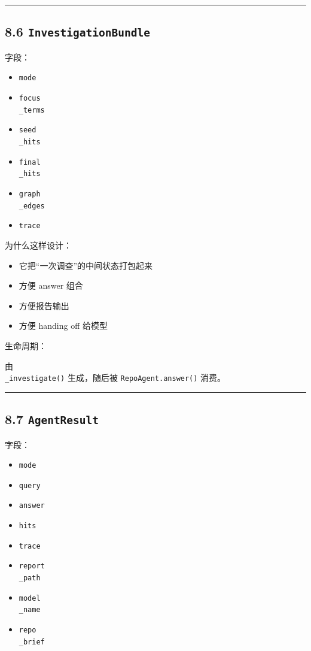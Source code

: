 \documentclass[UTF8,12pt,openany]{ctexbook}
\begin{document}
\hrule

\subsection{8.6 \texttt{InvestigationBundle}}

字段：\par

\begin{itemize}
\item \texttt{mode}
\item \texttt{focus\\_terms}
\item \texttt{seed\\_hits}
\item \texttt{final\\_hits}
\item \texttt{graph\\_edges}
\item \texttt{trace}
\end{itemize}

为什么这样设计：\par

\begin{itemize}
\item 它把“一次调查”的中间状态打包起来
\item 方便 answer 组合
\item 方便报告输出
\item 方便 handing off 给模型
\end{itemize}

生命周期：\par

由 \texttt{\\_investigate()} 生成，随后被 \texttt{RepoAgent.answer()} 消费。\par

\hrule

\subsection{8.7 \texttt{AgentResult}}

字段：\par

\begin{itemize}
\item \texttt{mode}
\item \texttt{query}
\item \texttt{answer}
\item \texttt{hits}
\item \texttt{trace}
\item \texttt{report\\_path}
\item \texttt{model\\_name}
\item \texttt{repo\\_brief}
\end{itemize}
\end{document}
